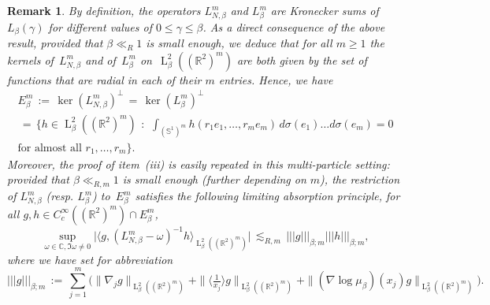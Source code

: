 \documentclass[a4paper,11pt,reqno,noindent]{amsart}
\theoremstyle{plain}
\newtheorem{rem}[lem]{Remark}
\numberwithin{equation}{section}
\newcommand{\R}{\mathbb R}
\newcommand{\C}{\mathbb C}
\newcommand{\Sp}{\mathbb S}
\newcommand{\3}{|\!|\!|}
\newcommand{\Ld}{\operatorname{L}}
\begin{document}
\begin{rem}\label{rem:nonGaus}
By definition, the operators $L_{N,\beta}^m$ and $L_\beta^m$ are Kronecker sums of $L_\beta(\gamma)$ for different values of $0\le\gamma\le\beta$.
As a direct consequence of the above result, provided that $\beta\ll_R1$ is small enough, we deduce that for all $m\ge1$ the kernels of~$L_{N,\beta}^m$ and of~$L_\beta^m$ on~$\Ld^2_\beta((\R^2)^m)$ are both given by the set of functions that are radial in each of their $m$ entries. Hence, we have
\begin{multline*}
E_\beta^m\,:=\,\ker(L_{N,\beta}^m)^\bot\,=\,\ker(L_{\beta}^m)^\bot\\
\,=\,\bigg\{h\in\Ld^2_\beta((\R^2)^m)~\,:\,~\int_{(\Sp^1)^m}h(r_1e_1,\ldots,r_me_m)\,d\sigma(e_1)\ldots d\sigma(e_m)=0\\[-4mm]
\text{for almost all $r_1,\ldots,r_m$}\bigg\}.
\end{multline*}
Moreover, the proof of item~(iii) is easily repeated in this multi-particle setting: provided that $\beta\ll_{R,m}1$ is small enough (further depending on $m$), the restriction of $L_{N,\beta}^m$ (resp. $L_\beta^m$) to~$E_\beta^m$ satisfies the following limiting absorption principle, for all $g,h\in C^\infty_c((\R^2)^m)\cap E_\beta^m$,
\[\sup_{\omega\in\C,\Im\omega\ne0}\big|\big\langle g,(L_{N,\beta}^m-\omega)^{-1}h\big\rangle_{\Ld^2_\beta((\R^2)^m)}\big|
\,\lesssim_{R,m}\,\3g\3_{\beta;m}\3h\3_{\beta;m},\]
where we have set for abbreviation
\begin{equation*}
\3g\3_{\beta;m}\,:=\,\sum_{j=1}^m\Big(\|\nabla_j g\|_{\Ld^2_\beta((\R^2)^m)}
+\|\langle\tfrac1{x_j}\rangle g\|_{\Ld^2_\beta((\R^2)^m)}
+\|(\nabla\log\mu_\beta)(x_j)g\|_{\Ld^2_\beta((\R^2)^m)}\Big).
\end{equation*}
\end{rem}
\end{document}
